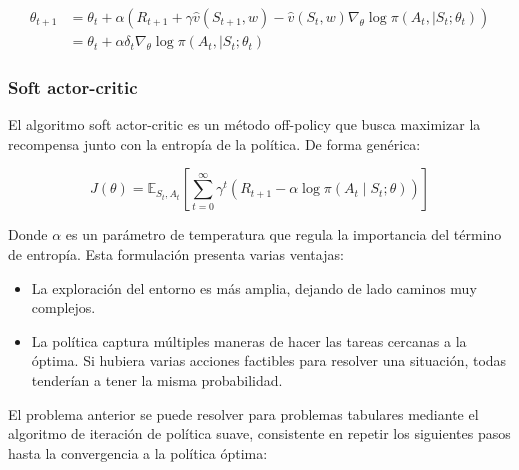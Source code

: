\documentclass[11pt,a4paper]{article}
\begin{document}
		\begin{align}
		\theta_{t+1} &= \theta_t + \alpha \left( R_{t+1} + \gamma \hat{v}(S_{t+1}, w) - \hat{v}(S_t, w) \nabla_\theta \log \pi(A_t, \mid S_t ; \theta_t) \right) \nonumber \\ 
		&= \theta_t + \alpha \delta_t \nabla_\theta \log \pi(A_t, \mid S_t ; \theta_t)
		\end{align}
		
		\subsubsection{Soft actor-critic}
		El algoritmo soft actor-critic es un método off-policy que busca maximizar la recompensa junto con la entropía de la política. De forma genérica:
		
		\begin{equation}
		J(\theta) = \mathbb{E}_{S_t, A_t} \left[ \sum_{t=0}^{\infty} \gamma^t \left( R_{t+1} - \alpha \log \pi(A_t \mid S_t ; \theta) \right) \right]
		\end{equation}
		
		Donde $\alpha$ es un parámetro de temperatura que regula la importancia del término de entropía. Esta formulación presenta varias ventajas:
		
		\begin{itemize}
			\item La exploración del entorno es más amplia, dejando de lado caminos muy complejos.
			\item La política captura múltiples maneras de hacer las tareas cercanas a la óptima. Si hubiera varias acciones factibles para resolver una situación, todas tenderían a tener la misma probabilidad.
		\end{itemize}
		
		El problema anterior se puede resolver para problemas tabulares mediante el algoritmo de iteración de política suave, consistente en repetir los siguientes pasos hasta la convergencia a la política óptima\cite{haarnoja2018soft}:
		
\end{document}
